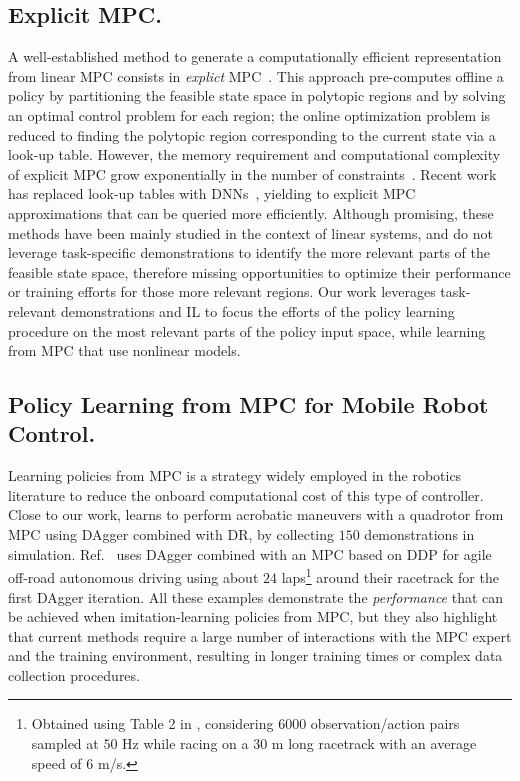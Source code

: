 \subsection{Explicit MPC.}
 A well-established method to generate a computationally efficient representation from linear MPC consists in \textit{explict} MPC~\cite{borrelli2017predictive}. This approach pre-computes offline a policy by partitioning the feasible state space in polytopic regions and by solving an optimal control problem for each region; the online optimization problem is reduced to finding the polytopic region corresponding to the current state via a look-up table.
However, the memory requirement and computational complexity of explicit \ac{MPC} grow exponentially in the number of constraints~\cite {borrelli2017predictive, zhang2020near}. Recent work has replaced look-up tables with \acp{DNN}~\cite{hertneck2018learning, chen2018approximating, zhang2020near, chen2022large}, yielding to explicit \ac{MPC} approximations that can be queried more efficiently. Although promising, these methods have been mainly studied in the context of linear systems, and do not leverage task-specific demonstrations to identify the more relevant parts of the feasible state space, therefore missing opportunities to optimize their performance or training efforts for those more relevant regions. 
Our work leverages task-relevant demonstrations and \ac{IL} to focus the efforts of the policy learning procedure on the most relevant parts of the policy input space, while learning from \ac{MPC} that use nonlinear models.    

\subsection{Policy Learning from MPC for Mobile Robot Control.}
Learning policies from \ac{MPC} is a strategy widely employed in the robotics literature to reduce the onboard computational cost of this type of controller.
Close to our work, \cite{kaufmann2020deep} learns to perform acrobatic maneuvers with a quadrotor from \ac{MPC} using \ac{DAgger} combined with \ac{DR}, by collecting $150$ demonstrations in simulation. Ref.~\cite{pan2020imitation} uses \ac{DAgger} combined with an \ac{MPC} based on \ac{DDP} \cite{jacobson1970differential} for agile off-road autonomous driving using about $24$ laps\footnote{Obtained using Table 2 in \cite{pan2020imitation}, considering $6000$ observation/action pairs sampled at $50$ Hz while racing on a $30$ m long racetrack with an average speed of $6$ m/s.} around their racetrack for the first \ac{DAgger} iteration.
All these examples demonstrate the \textit{performance} that can be achieved when imitation-learning policies from \ac{MPC}, but they also highlight that current methods require a large number of interactions with the \ac{MPC} expert and the training environment, resulting in longer training times or complex data collection procedures.

